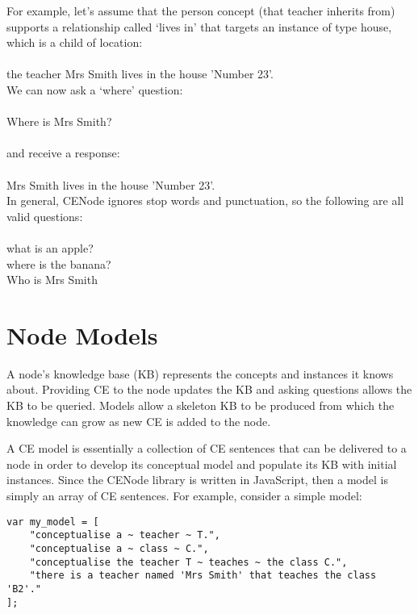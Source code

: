 \documentclass{scrartcl}
\newcommand{\ce}[1]{\textsf{#1}}
\begin{document}
For example, let's assume that the \ce{person} concept (that \ce{teacher} inherits from) supports a relationship called `lives in' that targets an instance of type \ce{house}, which is a child of \ce{location}:\\
\\\ce{the teacher Mrs Smith lives in the house 'Number 23'.}\\

We can now ask a `where' question:\\
\\\ce{Where is Mrs Smith?}\\
\\and receive a response:\\
\\\ce{Mrs Smith lives in the house 'Number 23'.}\\

In general, CENode ignores stop words and punctuation, so the following are all valid questions:\\
\\\ce{what is an apple?}\\
\ce{where is the banana?}\\
\ce{Who is Mrs Smith}


\section{Node Models}
\label{models}
A node's knowledge base (KB) represents the concepts and instances it knows about. Providing CE to the node updates the KB and asking questions allows the KB to be queried. Models allow a skeleton KB to be produced from which the knowledge can grow as new CE is added to the node.

A CE model is essentially a collection of CE sentences that can be delivered to a node in order to develop its conceptual model and populate its KB with initial instances. Since the CENode library is written in JavaScript, then a model is simply an array of CE sentences. For example, consider a simple model:

\begin{samepage}
\begin{verbatim}
var my_model = [
    "conceptualise a ~ teacher ~ T.",
    "conceptualise a ~ class ~ C.",
    "conceptualise the teacher T ~ teaches ~ the class C.",
    "there is a teacher named 'Mrs Smith' that teaches the class 'B2'."
];
\end{verbatim}
\end{samepage}
\end{document}
